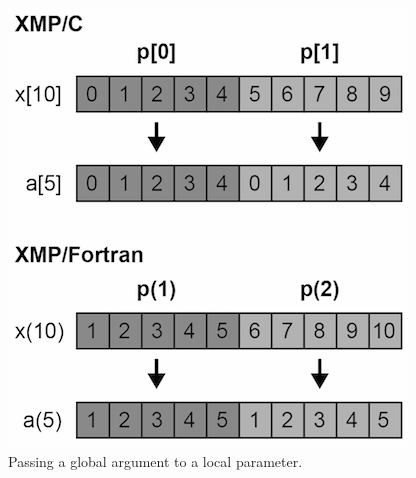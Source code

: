 \begin{figure}
  \centering
  \includegraphics[width=0.9\columnwidth]{figs/duplicated_array.png}
  \caption{Passing a global argument to a local parameter.}
\end{figure}